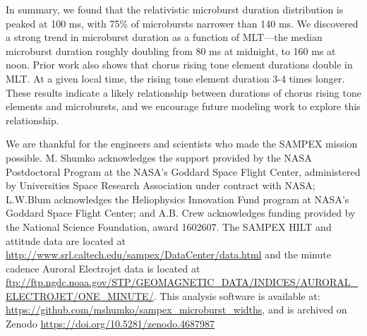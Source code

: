 \documentclass[draft]{agujournal2019}
\begin{document}
In summary, we found that the relativistic microburst duration distribution is peaked at 100 ms, with 75\% of microbursts narrower than 140 ms. We discovered a strong trend in microburst duration as a function of MLT---the median microburst duration roughly doubling from 80 ms at midnight, to 160 ms at noon. Prior work also shows that chorus rising tone element durations double in MLT. At a given local time, the rising tone element duration 3-4 times longer. These results indicate a likely relationship between durations of chorus rising tone elements and microbursts, and we encourage future modeling work to explore this relationship.


%
%
%
%

\acknowledgments
We are thankful for the engineers and scientists who made the SAMPEX mission possible. M. Shumko acknowledges the support provided by the NASA Postdoctoral Program at the NASA’s Goddard Space Flight Center, administered by Universities Space Research Association under contract with NASA; L.W.Blum acknowledges the Heliophysics Innovation Fund program at NASA’s Goddard Space Flight Center; and A.B. Crew acknowledges funding provided by the National Science Foundation, award 1602607. The SAMPEX HILT and attitude data are located at \url{http://www.srl.caltech.edu/sampex/DataCenter/data.html} and the minute cadence Auroral Electrojet data is located at \url{ftp://ftp.ngdc.noaa.gov/STP/GEOMAGNETIC_DATA/INDICES/AURORAL_ELECTROJET/ONE_MINUTE/}.
This analysis software is available at: \url{https://github.com/mshumko/sampex_microburst_widths}, and is archived on Zenodo \url{https://doi.org/10.5281/zenodo.4687987}



%
%
\end{document}
